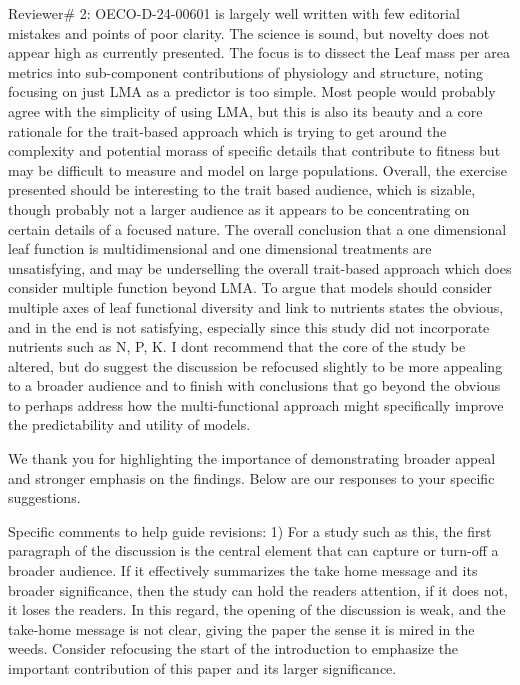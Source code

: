 \documentclass[
  12pt,
  letterpaper,
  DIV=11,
  numbers=noendperiod]{scrartcl}
\renewenvironment{quote}
  {\begin{customblockquote}\color{blockquote-text}\ignorespaces}
  {\end{customblockquote}}
\begin{document}
\begin{quote}
Reviewer\# 2: OECO-D-24-00601 is largely well written with few editorial
mistakes and points of poor clarity. The science is sound, but novelty
does not appear high as currently presented. The focus is to dissect the
Leaf mass per area metrics into sub-component contributions of
physiology and structure, noting focusing on just LMA as a predictor is
too simple. Most people would probably agree with the simplicity of
using LMA, but this is also its beauty and a core rationale for the
trait-based approach which is trying to get around the complexity and
potential morass of specific details that contribute to fitness but may
be difficult to measure and model on large populations. Overall, the
exercise presented should be interesting to the trait based audience,
which is sizable, though probably not a larger audience as it appears to
be concentrating on certain details of a focused nature. The overall
conclusion that a one dimensional leaf function is multidimensional and
one dimensional treatments are unsatisfying, and may be underselling the
overall trait-based approach which does consider multiple function
beyond LMA. To argue that models should consider multiple axes of leaf
functional diversity and link to nutrients states the obvious, and in
the end is not satisfying, especially since this study did not
incorporate nutrients such as N, P, K. I dont recommend that the core of
the study be altered, but do suggest the discussion be refocused
slightly to be more appealing to a broader audience and to finish with
conclusions that go beyond the obvious to perhaps address how the
multi-functional approach might specifically improve the predictability
and utility of models.
\end{quote}

We thank you for highlighting the importance of demonstrating broader
appeal and stronger emphasis on the findings. Below are our responses to
your specific suggestions.

\begin{quote}
Specific comments to help guide revisions: 1) For a study such as this,
the first paragraph of the discussion is the central element that can
capture or turn-off a broader audience. If it effectively summarizes the
take home message and its broader significance, then the study can hold
the readers attention, if it does not, it loses the readers. In this
regard, the opening of the discussion is weak, and the take-home message
is not clear, giving the paper the sense it is mired in the weeds.
Consider refocusing the start of the introduction to emphasize the
important contribution of this paper and its larger significance.
\end{quote}
\end{document}
